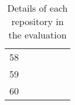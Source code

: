 \begin{table}[ht]
\begin{tabular}{c|lllll}
    58                       &                                          &                                           &                                                &                                    &                                      \\
    59                       &                                          &                                           &                                                &                                    &                                      \\
    60                       &                                          &                                           &                                                &                                    &                                      \\ \hline
    \end{tabular}
    \label{tab:appendix2_details_of_each_repository}
    \caption{Details of each repository in the evaluation}
\end{table}